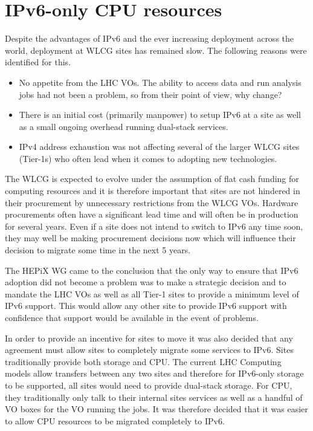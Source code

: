 \documentclass[a4paper]{jpconf}
\begin{document}

\section{IPv6-only CPU resources}
Despite the advantages of IPv6 and the ever increasing deployment
across the world, deployment at WLCG sites has remained slow.  The
following reasons were identified for this.
\begin{itemize}
\item No appetite from the LHC VOs.  The ability to access data and
  run analysis jobs had not been a problem, so from their point of
  view, why change?
\item There is an initial cost (primarily manpower) to setup IPv6 at a
  site as well as a small ongoing overhead running dual-stack
  services.
\item IPv4 address exhaustion was not affecting several of the larger
  WLCG sites (Tier-1s) who often lead when it comes to adopting new
  technologies.
\end{itemize}

The WLCG is expected to evolve under the assumption of flat cash
funding for computing resources and it is therefore important that
sites are not hindered in their procurement by unnecessary
restrictions from the WLCG VOs. Hardware procurements often have a
significant lead time and will often be in production for several
years.  Even if a site does not intend to switch to IPv6 any time
soon, they may well be making procurement decisions now which will
influence their decision to migrate some time in the next 5 years.

The HEPiX WG came to the conclusion that the only way to ensure that
IPv6 adoption did not become a problem was to make a strategic
decision and to mandate the LHC VOs as well as all Tier-1 sites to provide
a minimum level of IPv6 support.  This would allow any other site to
provide IPv6 support with confidence that support would be available
in the event of problems.

In order to provide an incentive for sites to move it was also decided
that any agreement must allow sites to completely migrate some
services to IPv6. Sites traditionally provide both storage and CPU.
The current LHC Computing models allow transfers between any two sites
and therefore for IPv6-only storage to be supported, all sites would
need to provide dual-stack storage.  For CPU, they traditionally only
talk to their internal sites services as well as a handful of VO boxes
for the VO running the jobs.  It was therefore decided that it was
easier to allow CPU resources to be migrated completely to IPv6.
\end{document}
